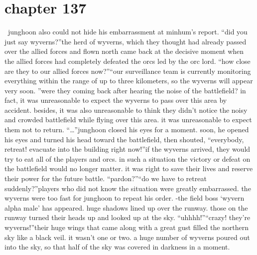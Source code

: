 \section{chapter 137}






 junghoon also could not hide his embarrassment at minhum’s report.
“did you just say wyverns?”the herd of wyverns, which they thought had already passed over the allied forces and flown north came back at the decisive moment when the allied forces had completely defeated the orcs led by the orc lord.
“how close are they to our allied forces now?”“our surveillance team is currently monitoring everything within the range of up to three kilometers, so the wyverns will appear very soon.
”were they coming back after hearing the noise of the battlefield? in fact, it was unreasonable to expect the wyverns to pass over this area by accident.
 besides, it was also unreasonable to think they didn’t notice the noisy and crowded battlefield while flying over this area.
it was unreasonable to expect them not to return.
“…”junghoon closed his eyes for a moment.
 soon, he opened his eyes and turned his head toward the battlefield, then shouted, “everybody, retreat! evacuate into the building right now!”if the wyverns arrived, they would try to eat all of the players and orcs.
in such a situation the victory or defeat on the battlefield would no longer matter.
 it was right to save their lives and reserve their power for the future battle.
“pardon?”“do we have to retreat suddenly?”players who did not know the situation were greatly embarrassed.
 the wyverns were too fast for junghoon to repeat his order.
-the field boss ‘wyvern alpha male’ has appeared.
huge shadows lined up over the runway.
 those on the runway turned their heads up and looked up at the sky.
“uhhhh!”“crazy! they’re wyverns!”their huge wings that came along with a great gust filled the northern sky like a black veil.
it wasn’t one or two.
 a huge number of wyverns poured out into the sky, so that half of the sky was covered in darkness in a moment.

